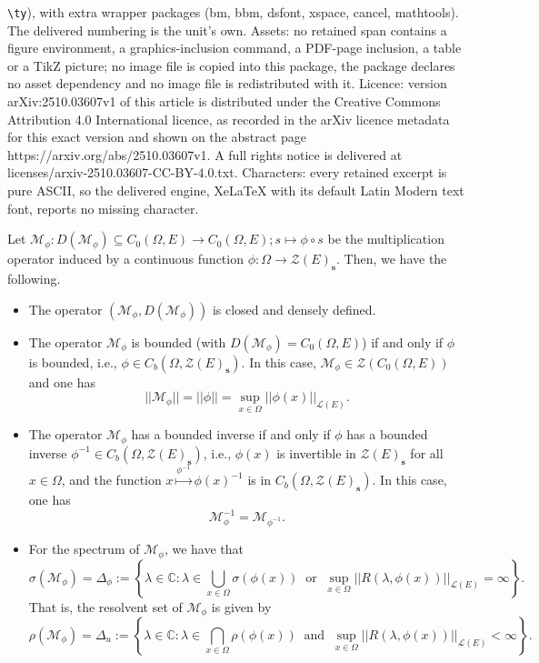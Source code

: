 \documentclass[10pt,a4paper]{amsart}
\newcommand{\Bm}[1]{ \boldsymbol{ #1 }}
\newcommand{\C}{\mathbb{C}}
\newcommand{\Om}{\Omega}
\newcommand{\bei}{\begin{itemize}}
\newcommand{\cc}{\circ}
\newcommand{\eei}{\end{itemize}}
\newcommand{\la}{\lambda}
\newcommand{\lb}{\left\lbrace}
\newcommand{\lo}{\longrightarrow}
\newcommand{\mM}{\mathcal{M}}
\newcommand{\mZ}{\mathcal{Z}}
\newcommand{\mt}{\mapsto}
\newcommand{\rb}{\right\rbrace }
\newcommand{\sL}{\mathscr{L}}
\newcommand{\sig}{\sigma}
\newcommand{\sse}{\subseteq}
\newcommand{\ty}{\infty}
\begin{document}
\texttt{\textbackslash ty}), with extra wrapper packages (bm, bbm, dsfont, xspace, cancel, mathtools). The delivered numbering is the unit's own. Assets: no retained span contains a figure environment, a graphics-inclusion command, a PDF-page inclusion, a table or a TikZ picture; no image file is copied into this package, the package declares no asset dependency and no image file is redistributed with it. Licence: version arXiv:2510.03607v1 of this article is distributed under the Creative Commons Attribution 4.0 International licence, as recorded in the arXiv licence metadata for this exact version and shown on the abstract page https://arxiv.org/abs/2510.03607v1. A full rights notice is delivered at licenses/arxiv-2510.03607-CC-BY-4.0.txt. Characters: every retained excerpt is pure ASCII, so the delivered engine, XeLaTeX with its default Latin Modern text font, reports no missing character.
\begin{prop}\label{prop:mop1}
	Let $\mM_\phi : D(\mM_\phi)\sse C_0(\Om, E) \lo C_0(\Om, E); s \mt \phi\cc s$ be the multiplication operator induced by a continuous function $\phi : \Om \lo  \Bm{\mZ}(E)_\textbf{s}$. Then, we have the following.
	\bei	
	\item[(i)] The operator $(\mM_\phi,  D(\mM_\phi)  )$ is closed and densely defined.
	
	\item[(ii)] The operator $\mM_\phi$ is bounded (with $D(\mM_\phi) =C_0(\Om, E)$) if and only if $\phi$ is bounded, i.e., $\phi\in C_b(\Om, \Bm{\mZ}(E)_\textbf{s})$. In this case,  $\mM_\phi\in\Bm{\mZ} ( C_0(\Om, E))$ and one has
	$$||\mM_\phi||= ||\phi||= \sup_{x\in\Om}||\phi(x)||_{\sL(E)}.$$
	
	\item[(iii)] The operator $\mM_\phi$ has a bounded inverse if and only if $\phi$ has a bounded inverse $\phi^{-1}\in C_b(\Om, \Bm{\mZ}(E)_\textbf{s})$, i.e., $\phi(x)$ is invertible in $\Bm{\mZ}(E)_\textbf{s}$ for all $x\in\Om$, and the function $ x  \overset{\phi^{-1}}{\longmapsto}       \phi(x)^{-1}$ is in $C_b(\Om, \Bm{\mZ}(E)_\textbf{s})$.
	 In this case, one has
	\[  \mM_\phi^{-1}= \mM_{\phi^{-1} }.\]
	\item[(iv)] For the spectrum of $\mM_\phi$, we have that
		\[\sig(\mM_\phi)=  \Delta_\phi:=  \lb  \la\in\C :\la \in\bigcup_{x\in \Om}\sig(\phi(x)) \ \text{ or } \     \sup_{x\in\Om}|| R(\la, \phi(x))||_{\sL(E)}=\ty  \rb.\] 
	That is, the resolvent set of $\mM_\phi$ is given by 
	\[ \rho(\mM_\phi) = \Delta_u:= \lb \la\in\C : \la \in \bigcap_{x\in \Om} \rho(\phi(x)) \ \text{ and } \  \sup_{x\in\Om}|| R(\la, \phi(x))||_{\sL(E)}<\ty \rb.\]	
	\eei
\end{prop}
\end{document}
